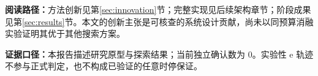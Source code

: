 \vspace{0.5em}
\noindent\small\textcolor{aurorablue}{\textbf{阅读路径：}}方法创新见第\ref{sec:innovation}节；完整实现见后续架构章节；阶段成果见第\ref{sec:results}节。本文的创新主张是可核查的系统设计贡献，尚未以同预算消融实验证明其优于其他搜索方案。

\vspace{0.5em}
\noindent\footnotesize\textcolor{aurorablue}{\textbf{证据口径：}}本报告描述研究原型与探索结果；当前独立确认数为 0。实验性 e 轨迹不参与正式判定，也不构成已验证的任意时停保证。\normalsize
\clearpage
